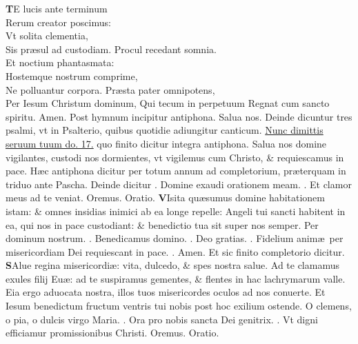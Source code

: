 \documentclass[a5paper,10pt]{book}
\makeatletter
\DeclareRobustCommand{\Vbar}{\vers@resp{-0.1em}{V}}
\DeclareRobustCommand{\Rbar}{\vers@resp{0pt}{R}}
\newcommand{\vers@resp@sym}{\raisebox{0.2ex}{\rotatebox[origin=c]{-20}{$\m@th\rceil$}}}
\newcommand{\vers@resp}[2]{%
  {\ooalign{\hidewidth\kern#1\vers@resp@sym\hidewidth\cr#2\cr}}%
}%
\def\ae{æ}
\makeatother
\begin{document}
\begin{multicols*}{2}
\vspace{-.25em}
\lettrine[lines=2]{\bfseries \color{red} T}{}E lucis ante terminum\\Rerum creator poscimus:\\Vt solita clementia,\\Sis pr\ae sul ad custodiam.
\newline \color{red} P\color{black}rocul recedant somnia.\\Et noctium phantasmata:\\Hostemque nostrum comprime,\\Ne polluantur corpora.
\newline \color{red} P\color{black}r\ae sta pater omnipotens,\\Per Iesum Christum dominum, Qui tecum in perpetuum Regnat cum sancto spiritu. Amen.
\newline {} \color{red} Post hymnum incipitur antiphona. \color{black} Salua nos. \color{red} Deinde dicuntur tres psalmi, vt in Psalterio, quibus quotidie adiungitur canticum. \color{black} \hyperlink{Nunc}{Nunc dimittis seruum tuum do. 17.} \color{red} quo finito dicitur integra antiphona. \color{black} Salua nos domine vigilantes, custodi nos dormientes, vt vigilemus cum Christo, \& requiescamus in pace.
\newline {} \color{red} H\ae c antiphona dicitur per totum annum ad completorium, pr\ae terquam in triduo ante Pascha. Deinde dicitur \Vbar . \color{black} Domine exaudi orationem meam. \color{red} \Rbar . \color{black} Et clamor meus ad te veniat. \color{red} O\color{black}remus. \color{red} Oratio. \color{black}
\vspace{-.25em}
\lettrine[lines=2]{\bfseries \color{red} V}{}Isita qu\ae sumus domine habitationem istam: \& omnes insidias inimici ab ea longe repelle: Angeli tui sancti habitent in ea, qui nos in pace custodiant: \& benedictio tua sit super nos semper. Per dominum nostrum. \color{red} \Vbar . \color{black} Benedicamus domino. \color{red} \Rbar . \color{black} Deo gratias. \color{red} \Vbar . \color{black} Fidelium anim\ae \ per misericordiam Dei requiescant in pace. \color{red} \Rbar . \color{black} Amen. 
\newline \color{red} Et sic finito completorio dicitur. \color{black}
\vspace{-.25em}
\lettrine[lines=2]{\bfseries \color{red} S}{}Alue regina misericordi\ae : vita, dulcedo, \& spes nostra salue. Ad te clamamus exules filij Eu\ae : ad te suspiramus gementes, \&  flentes in hac lachrymarum valle. Eia ergo aduocata nostra, illos tuos misericordes oculos ad nos conuerte. Et Iesum benedictum fructum ventris tui nobis post hoc exilium ostende. O clemens, o pia, o dulcis virgo Maria. \color{red} \Vbar . \color{black} Ora pro nobis sancta Dei genitrix. \color{red} \Rbar . \color{black} Vt digni efficiamur promissionibus Christi. \color{red} O\color{black}remus. \color{red} Oratio. \color{black}

\end{multicols*}
\end{document}
